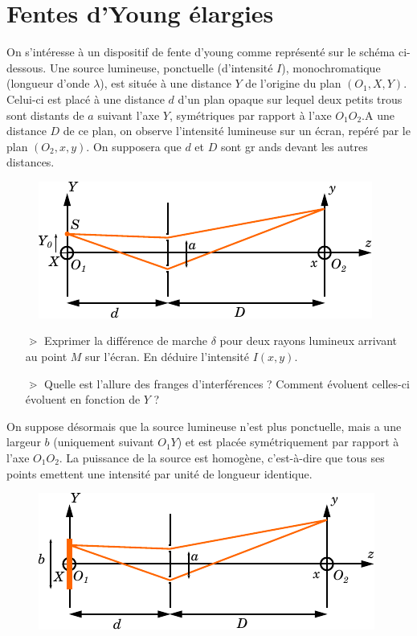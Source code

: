 \documentclass{report}
\begin{document}
\section*{Fentes d'Young élargies}

On s'intéresse à un dispositif de fente d'young comme représenté sur le schéma ci-dessous. Une source lumineuse, ponctuelle (d'intensité $I$), monochromatique (longueur d'onde $\lambda$), est située à une distance $Y$ de l'origine du plan $(O_1,X,Y)$. Celui-ci est placé à une distance $d$ d'un plan opaque sur lequel deux petits trous sont distants de $a$ suivant l'axe $Y$, symétriques par rapport à l'axe $O_1O_2$.A une distance $D$ de ce plan, on observe l'intensité lumineuse sur un écran, repéré par le plan $(O_2,x,y)$. On supposera que $d$ et $D$ sont gr	ands devant les autres distances.

\begin{figure}[h]
\centering
  \includegraphics[scale=1.0]{young1.pdf}
\end{figure}

\begin{itemize}

	\item[$\gtrdot$] Exprimer la différence de marche $\delta$ pour deux rayons lumineux arrivant au point $M$ sur l'écran. En déduire l'intensité $I(x,y)$.
	
	\item[$\gtrdot$] Quelle est l'allure des franges d'interférences ? Comment évoluent celles-ci évoluent en fonction de $Y$ ?

\end{itemize}

On suppose désormais que la source lumineuse n'est plus ponctuelle, mais a une largeur $b$ (uniquement suivant $O_1Y$) et est placée symétriquement par rapport à l'axe $O_1O_2$. La puissance de la source est homogène, c'est-à-dire que tous ses points emettent une intensité par unité de longueur identique.

\begin{figure}[h]
\centering
  \includegraphics[scale=1.0]{young2.pdf}
\end{figure}
\end{document}
